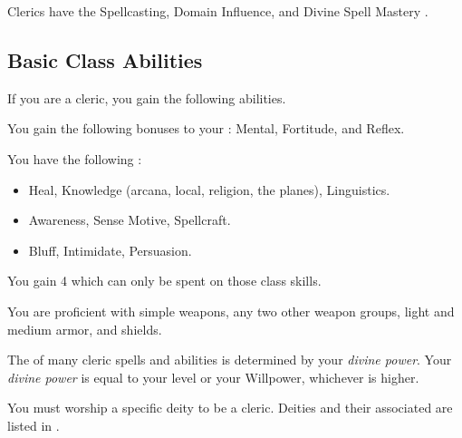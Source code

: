     Clerics have the Spellcasting, Domain Influence, and Divine Spell Mastery .

    \subsection{Basic Class Abilities}
        If you are a cleric, you gain the following abilities.

        You gain the following bonuses to your :  Mental,  Fortitude, and  Reflex.

        You have the following :
        \begin{itemize}
            \item {} Heal, Knowledge (arcana, local, religion, the planes), Linguistics.
            \item {} Awareness, Sense Motive, Spellcraft.
            \item {} Bluff, Intimidate, Persuasion.
        \end{itemize}
        You gain 4  which can only be spent on those class skills.

        You are proficient with simple weapons, any two other weapon groups, light and medium armor, and shields.

        The  of many cleric spells and abilities is determined by your \textit{divine power}.
        Your \textit{divine power} is equal to your level or your Willpower, whichever is higher.

        You must worship a specific deity to be a cleric.
        Deities and their associated  are listed in .


